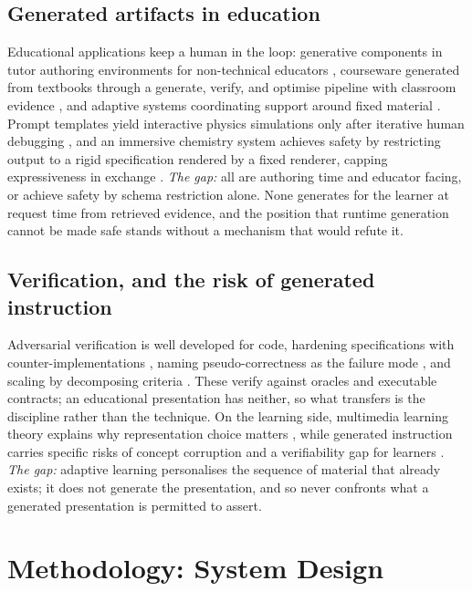 \documentclass[conference]{IEEEtran}
\begin{document}
\subsection{Generated artifacts in education}
Educational applications keep a human in the loop: generative components in tutor authoring environments for non-technical educators \cite{ref:calo}, courseware generated from textbooks through a generate, verify, and optimise pipeline with classroom evidence \cite{ref:maicui}, and adaptive systems coordinating support around fixed material \cite{ref:learnmate}. Prompt templates yield interactive physics simulations only after iterative human debugging \cite{ref:promptsim}, and an immersive chemistry system achieves safety by restricting output to a rigid specification rendered by a fixed renderer, capping expressiveness in exchange \cite{ref:chemersive}. \emph{The gap:} all are authoring time and educator facing, or achieve safety by schema restriction alone. None generates for the learner at request time from retrieved evidence, and the position that runtime generation cannot be made safe \cite{ref:neshaei} stands without a mechanism that would refute it.

\subsection{Verification, and the risk of generated instruction}
Adversarial verification is well developed for code, hardening specifications with counter-implementations \cite{ref:probe}, naming pseudo-correctness as the failure mode \cite{ref:advermcts}, and scaling by decomposing criteria \cite{ref:kwok}. These verify against oracles and executable contracts; an educational presentation has neither, so what transfers is the discipline rather than the technique. On the learning side, multimedia learning theory explains why representation choice matters \cite{ref:mayer}, while generated instruction carries specific risks of concept corruption \cite{ref:eduevaldb} and a verifiability gap for learners \cite{ref:shoufan}. \emph{The gap:} adaptive learning personalises the sequence of material that already exists; it does not generate the presentation, and so never confronts what a generated presentation is permitted to assert.
\section{Methodology: System Design}
\label{sec:method}
\end{document}
